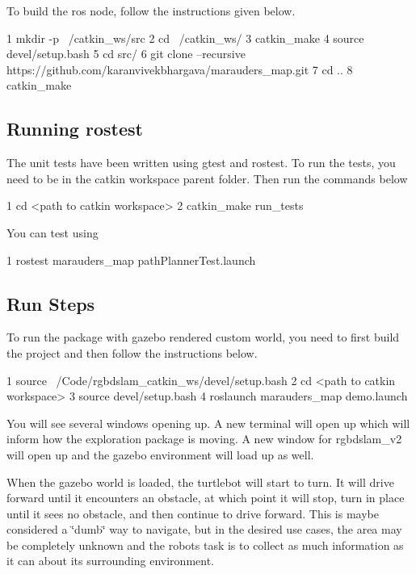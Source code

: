 To build the ros node, follow the instructions given below.


\begin{DoxyCode}
1 mkdir -p ~/catkin\_ws/src
2 cd ~/catkin\_ws/
3 catkin\_make
4 source devel/setup.bash
5 cd src/
6 git clone --recursive https://github.com/karanvivekbhargava/marauders\_map.git
7 cd ..
8 catkin\_make
\end{DoxyCode}


\subsection*{Running rostest}

The unit tests have been written using gtest and rostest. To run the tests, you need to be in the catkin workspace parent folder. Then run the commands below


\begin{DoxyCode}
1 cd <path to catkin workspace>
2 catkin\_make run\_tests
\end{DoxyCode}
 You can test using 
\begin{DoxyCode}
1 rostest marauders\_map pathPlannerTest.launch
\end{DoxyCode}


\subsection*{Run Steps}

To run the package with gazebo rendered custom world, you need to first build the project and then follow the instructions below.


\begin{DoxyCode}
1 source ~/Code/rgbdslam\_catkin\_ws/devel/setup.bash
2 cd <path to catkin workspace>
3 source devel/setup.bash
4 roslaunch marauders\_map demo.launch
\end{DoxyCode}


You will see several windows opening up. A new terminal will open up which will inform how the exploration package is moving. A new window for rgbdslam\+\_\+v2 will open up and the gazebo environment will load up as well.



When the gazebo world is loaded, the turtlebot will start to turn. It will drive forward until it encounters an obstacle, at which point it will stop, turn in place until it sees no obstacle, and then continue to drive forward. This is maybe considered a \char`\"{}dumb\char`\"{} way to navigate, but in the desired use cases, the area may be completely unknown and the robot\textquotesingle{}s task is to collect as much information as it can about its surrounding environment.

